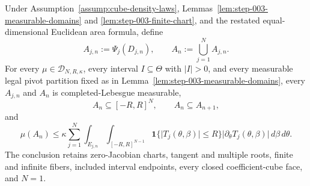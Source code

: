 \begin{proposition}
\label{prop:step-003-finite-area}

Under Assumption~\ref{assump:cube-density-laws},
Lemmas~\ref{lem:step-003-measurable-domains} and \ref{lem:step-003-finite-chart}, and the restated
equal-dimensional Euclidean area formula, define
\begin{equation}
\label{eq:appendix-display-080}
A_{j,n}:=\Psi_j(D_{j,n}),
\qquad
A_n:=\bigcup_{j=1}^N A_{j,n}.
\end{equation}
For every \(\mu\in\mathcal D_{N,R,\kappa}\), every interval
\(I\subseteq\Theta\) with \(\lvert I\rvert>0\), and every measurable legal pivot partition fixed as in
Lemma~\ref{lem:step-003-measurable-domains}, every \(A_{j,n}\) and \(A_n\) is completed-Lebesgue measurable,
\begin{equation}
\label{eq:appendix-display-081}
A_n\subseteq[-R,R]^N,
\qquad
A_n\subseteq A_{n+1},
\end{equation}
and
\begin{equation}
\label{eq:appendix-display-082}
\mu(A_n)
\leq
\kappa\sum_{j=1}^N
\int_{E_{j,n}}\int_{[-R,R]^{N-1}}
\mathbf 1\{\lvert T_j(\theta,\beta)\rvert\leq R\}
\lvert\partial_\theta T_j(\theta,\beta)\rvert
\,d\beta\,d\theta.
\end{equation}
The conclusion retains zero-Jacobian charts, tangent and multiple roots, finite and infinite fibers, included
interval endpoints, every closed coefficient-cube face, and \(N=1\).


\end{proposition}


